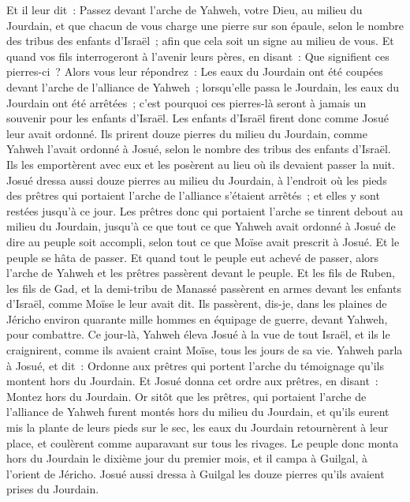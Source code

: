 \begin{multicols}{2}
Et il leur dit~: Passez devant l'arche de Yahweh, votre Dieu, au milieu du Jourdain, et que chacun de vous charge une pierre sur son épaule, selon le nombre des tribus des enfants d'Israël~;
afin que cela soit un signe au milieu de vous. Et quand vos fils interrogeront à l'avenir leurs pères, en disant~: Que signifient ces pierres-ci~?
Alors vous leur répondrez~: Les eaux du Jourdain ont été coupées devant l'arche de l'alliance de Yahweh~; lorsqu'elle passa le Jourdain, les eaux du Jourdain ont été arrêtées~; c'est pourquoi ces pierres-là seront à jamais un souvenir pour les enfants d'Israël.
Les enfants d'Israël firent donc comme Josué leur avait ordonné. Ils prirent douze pierres du milieu du Jourdain, comme Yahweh l'avait ordonné à Josué, selon le nombre des tribus des enfants d'Israël. Ils les emportèrent avec eux et les posèrent au lieu où ils devaient passer la nuit.
Josué dressa aussi douze pierres au milieu du Jourdain, à l'endroit où les pieds des prêtres qui portaient l'arche de l'alliance s'étaient arrêtés~; et elles y sont restées jusqu'à ce jour.
Les prêtres donc qui portaient l'arche se tinrent debout au milieu du Jourdain, jusqu'à ce que tout ce que Yahweh avait ordonné à Josué de dire au peuple soit accompli, selon tout ce que Moïse avait prescrit à Josué. Et le peuple se hâta de passer.
Et quand tout le peuple eut achevé de passer, alors l'arche de Yahweh et les prêtres passèrent devant le peuple.
Et les fils de Ruben, les fils de Gad, et la demi-tribu de Manassé passèrent en armes devant les enfants d'Israël, comme Moïse le leur avait dit.
Ils passèrent, dis-je, dans les plaines de Jéricho environ quarante mille hommes en équipage de guerre, devant Yahweh, pour combattre.
Ce jour-là, Yahweh éleva Josué à la vue de tout Israël, et ils le craignirent, comme ils avaient craint Moïse, tous les jours de sa vie.
Yahweh parla à Josué, et dit~:
Ordonne aux prêtres qui portent l'arche du témoignage qu'ils montent hors du Jourdain.
Et Josué donna cet ordre aux prêtres, en disant~: Montez hors du Jourdain.
Or sitôt que les prêtres, qui portaient l'arche de l'alliance de Yahweh furent montés hors du milieu du Jourdain, et qu'ils eurent mis la plante de leurs pieds sur le sec, les eaux du Jourdain retournèrent à leur place, et coulèrent comme auparavant sur tous les rivages.
Le peuple donc monta hors du Jourdain le dixième jour du premier mois, et il campa à Guilgal, à l'orient de Jéricho.
Josué aussi dressa à Guilgal les douze pierres qu'ils avaient prises du Jourdain.

\end{multicols}
